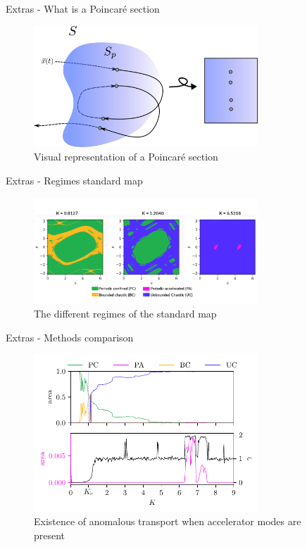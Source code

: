 \documentclass[10pt]{beamer}
\begin{document}
\begin{frame}{Extras - What is a Poincaré section}

    \begin{figure}
        \includegraphics[width = 0.75\textwidth]{imgs/Poincare_map.svg.png}
        \caption{Visual representation of a Poincaré section}
    \end{figure}
\end{frame}

\begin{frame}{Extras - Regimes standard map}
    \begin{figure}
        \includegraphics[width = 0.75\textwidth]{std/types.png}
        \caption{The different regimes of the standard map}
    \end{figure}
\end{frame}

\begin{frame}{Extras - Methods comparison}
    \begin{figure}
        \includegraphics[width = 0.75\textwidth]{std/areas.pdf}
        \caption{Existence of anomalous transport when accelerator modes are present}
    \end{figure}
\end{frame}
\end{document}
